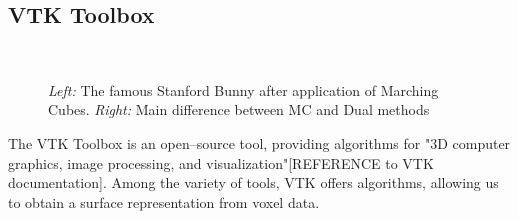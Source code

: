 \subsection{VTK Toolbox}
\begin{figure}
\centering
   \\
   \caption{\textit{Left:} The famous Stanford Bunny after application of Marching Cubes. \textit{Right:} Main difference between MC and Dual methods }
   \label{fig:bunny_MCDC}
\end{figure}

The VTK Toolbox is an open--source tool, providing algorithms for "3D computer graphics, image processing, and visualization"[REFERENCE to VTK documentation]. Among the variety of tools, VTK offers algorithms, allowing us to obtain a surface representation from voxel data. 

